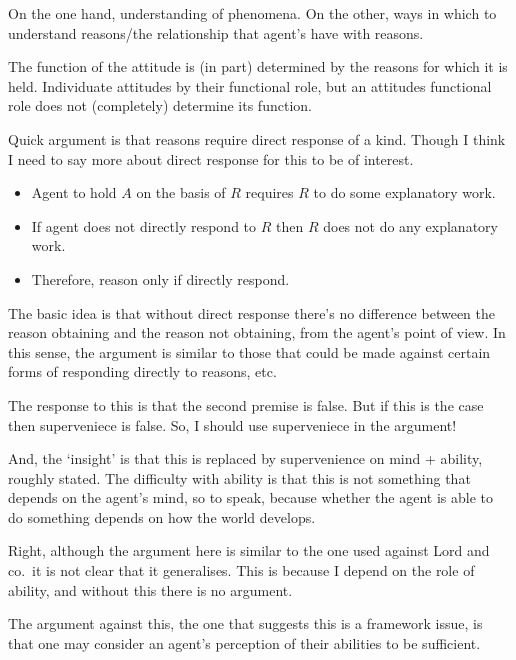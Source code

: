 \documentclass[10pt]{article}
\begin{document}
On the one hand, understanding of phenomena.
On the other, ways in which to understand reasons/the relationship that agent's have with reasons.


\begin{note}
  The function of the attitude is (in part) determined by the reasons for which it is held.
  Individuate attitudes by their functional role, but an attitudes functional role does not (completely) determine its function.
\end{note}

\begin{note}
  Quick argument is that reasons require direct response of a kind.
  Though I think I need to say more about direct response for this to be of interest.
  \begin{itemize}
  \item Agent to hold \(A\) on the basis of \(R\) requires \(R\) to do some explanatory work.
  \item If agent does not directly respond to \(R\) then \(R\) does not do any explanatory work.
  \item Therefore, reason only if directly respond.
  \end{itemize}
  The basic idea is that without direct response there's no difference between the reason obtaining and the reason not obtaining, from the agent's point of view.
  In this sense, the argument is similar to those that could be made against certain forms of responding directly to reasons, etc.

  The response to this is that the second premise is false.
  But if this is the case then superveniece is false.
  So, I should use superveniece in the argument!

  And, the `insight' is that this is replaced by supervenience on mind + ability, roughly stated.
  The difficulty with ability is that this is not something that depends on the agent's mind, so to speak, because whether the agent is able to do something depends on how the world develops.

  Right, although the argument here is similar to the one used against Lord and co.\ it is not clear that it generalises.
  This is because I depend on the role of ability, and without this there is no argument.

  The argument against this, the one that suggests this is a framework issue, is that one may consider an agent's perception of their abilities to be sufficient.
\end{note}
\end{document}
